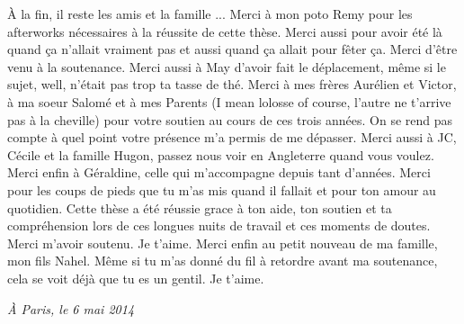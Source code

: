 \newpage

\`A la fin, il reste les amis et la famille ...
Merci à mon poto Remy pour les afterworks nécessaires
à la réussite de cette thèse. Merci aussi pour avoir été
là quand ça n'allait vraiment pas et aussi quand ça
allait pour fêter ça. Merci d'être venu à la soutenance.
Merci aussi à May d'avoir fait le déplacement, même
si le sujet, well, n'était pas trop ta tasse de thé.
Merci à mes frères Aurélien et Victor, à ma soeur Salomé et à mes
Parents (I mean lolosse of course, l'autre ne t'arrive pas
à la cheville) pour votre soutien au cours de ces trois années.
On se rend pas compte à quel point votre présence m'a permis de
me dépasser. Merci aussi à JC, Cécile et la famille Hugon, passez 
nous voir en Angleterre quand vous voulez. Merci enfin à Géraldine, celle qui 
m'accompagne depuis tant d'années. Merci pour les coups
de pieds que tu m'as mis quand il fallait et pour ton
amour au quotidien. Cette thèse a été réussie grace à ton aide,
ton soutien et ta compréhension lors de ces longues nuits 
de travail et ces moments de doutes. Merci m’avoir soutenu. Je t'aime.
Merci enfin au petit nouveau de ma famille, mon fils Nahel.
Même si tu m'as donné du fil à retordre avant ma soutenance,
cela se voit déjà que tu es un gentil. Je t'aime.

\begin{flushright}
\emph{\`A Paris, le 6 mai 2014}
\end{flushright}
